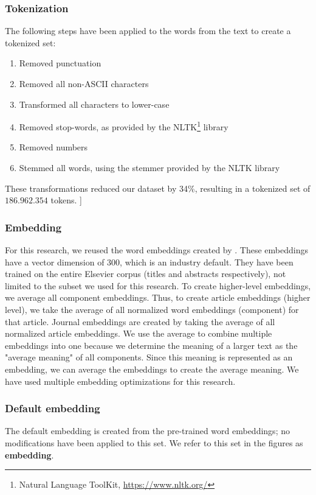\documentclass[../../Thesis.tex]{subfiles}
\begin{document}
\subsubsection{Tokenization}
The following steps have been applied to the words from the text to create a tokenized set:
\begin{enumerate}
\item{Removed punctuation}
\item{Removed all non-ASCII characters}
\item{Transformed all characters to lower-case}
\item{Removed stop-words, as provided by the NLTK\footnote{Natural Language ToolKit, \url{https://www.nltk.org/}} library}
\item{Removed numbers}
\item{Stemmed all words, using the stemmer provided by the NLTK library}
\end{enumerate}
These transformations reduced our dataset by 34\%, resulting in a tokenized set of $186.962.354$ tokens.
]\subsubsection{Embedding}
For this research, we reused the word embeddings created by \citet{Truong2017Thesis}. These embeddings have a vector dimension of 300, which is an industry default. They have been trained on the entire Elsevier corpus (titles and abstracts respectively), not limited to the subset we used for this research. To create higher-level embeddings, we average all component embeddings. Thus, to create article embeddings (higher level), we take the average of all normalized word embeddings (component) for that article. Journal embeddings are created by taking the average of all normalized article embeddings. We use the average to combine multiple embeddings into one because we determine the meaning of a larger text as the "average meaning" of all components. Since this meaning is represented as an embedding, we can average the embeddings to create the average meaning. We have used multiple embedding optimizations for this research.
\subsubsection{Default embedding}
The default embedding is created from the pre-trained word embeddings; no modifications have been applied to this set. We refer to this set in the figures as \textbf{embedding}.
\end{document}
